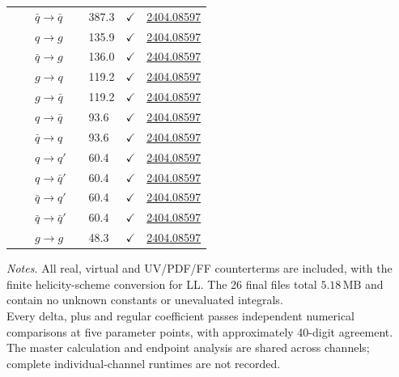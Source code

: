 \documentclass[11pt,a4paper]{article}
\newcommand{\verified}{\textcolor{green!45!black}{\ensuremath{\checkmark}}}
\begin{document}
\begin{center}
\begin{tabular}{|C{2.5cm}|C{1.2cm}|C{2.7cm}|C{2.0cm}|C{1.7cm}|C{1.8cm}|C{2.6cm}|}
 &  & $\bar q\to \bar q$ &  & 387.3 & \verified & \href{https://arxiv.org/abs/2404.08597v3}{2404.08597} \\
 &  & $q\to g$ &  & 135.9 & \verified & \href{https://arxiv.org/abs/2404.08597v3}{2404.08597} \\
 &  & $\bar q\to g$ &  & 136.0 & \verified & \href{https://arxiv.org/abs/2404.08597v3}{2404.08597} \\
 &  & $g\to q$ &  & 119.2 & \verified & \href{https://arxiv.org/abs/2404.08597v3}{2404.08597} \\
 &  & $g\to \bar q$ &  & 119.2 & \verified & \href{https://arxiv.org/abs/2404.08597v3}{2404.08597} \\
 &  & $q\to \bar q$ &  & 93.6 & \verified & \href{https://arxiv.org/abs/2404.08597v3}{2404.08597} \\
 &  & $\bar q\to q$ &  & 93.6 & \verified & \href{https://arxiv.org/abs/2404.08597v3}{2404.08597} \\
 &  & $q\to q'$ &  & 60.4 & \verified & \href{https://arxiv.org/abs/2404.08597v3}{2404.08597} \\
 &  & $q\to \bar q'$ &  & 60.4 & \verified & \href{https://arxiv.org/abs/2404.08597v3}{2404.08597} \\
 &  & $\bar q\to q'$ &  & 60.4 & \verified & \href{https://arxiv.org/abs/2404.08597v3}{2404.08597} \\
 &  & $\bar q\to \bar q'$ &  & 60.4 & \verified & \href{https://arxiv.org/abs/2404.08597v3}{2404.08597} \\
 &  & $g\to g$ &  & 48.3 & \verified & \href{https://arxiv.org/abs/2404.08597v3}{2404.08597} \\
\hline
\end{tabular}
\end{center}
\vspace{4pt}
{\footnotesize
\textit{Notes.} All real, virtual and UV/PDF/FF counterterms are included,
with the finite helicity-scheme conversion for LL.
The 26 final files total $5.18\,\mathrm{MB}$ and contain no unknown constants
or unevaluated integrals.\\[4pt]
Every delta, plus and regular coefficient passes independent numerical
comparisons at five parameter points, with approximately 40-digit agreement.
The master calculation and endpoint analysis are shared across channels;
complete individual-channel runtimes are not recorded.
}
\end{document}
